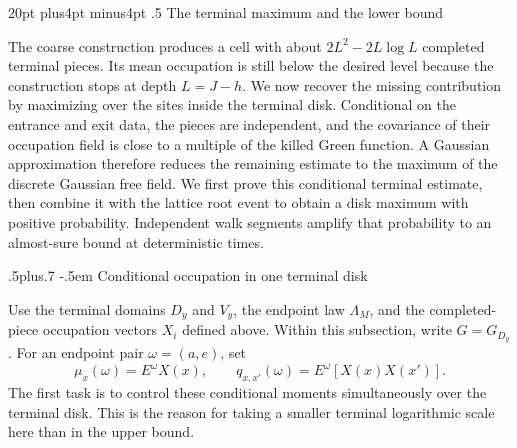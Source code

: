 \documentclass[12pt,reqno]{amsart}
\makeatletter
\def\section{\@startsection{section}{1}{0pt}%
  {20pt plus4pt minus4pt}
  {.5\linespacing}
  {\normalfont\bfseries}}
\def\subsection{\@startsection{subsection}{2}{0pt}%
  {.5\linespacing plus.7\linespacing}
  {-.5em}
  {\normalfont\scshape}}
\theoremstyle{plain}
\theoremstyle{definition}
\theoremstyle{remark}
\numberwithin{equation}{section}
\makeatother
\begin{document}
\section{The terminal maximum and the lower bound}
\label{sec:terminal-lower}

The coarse construction produces a cell with about
$2L^2-2L\log L$ completed terminal pieces.  Its mean occupation is
still below the desired level because the construction stops at depth
$L=J-h$.  We now recover the missing contribution by maximizing over
the sites inside the terminal disk.  Conditional on the entrance and
exit data, the pieces are independent, and the covariance of their
occupation field is close to a multiple of the killed Green function.
A Gaussian approximation therefore reduces the remaining estimate to
the maximum of the discrete Gaussian free field.
We first prove this conditional terminal estimate, then combine it with the
lattice root event to obtain a disk maximum with positive probability.
Independent walk segments amplify that probability to an almost-sure bound
at deterministic times.

\subsection{Conditional occupation in one terminal disk}

Use the terminal domains $D_y$ and $V_y$, the endpoint law $\Lambda_M$,
and the completed-piece occupation vectors $X_i$ defined above.  Within
this subsection, write $G=G_{D_y}$.  For an endpoint pair $\omega=(a,e)$,
set
\[
 \mu_x(\omega)=E^\omega X(x),\qquad
 q_{x,x'}(\omega)=E^\omega[X(x)X(x')].
\]
The first task is to control these conditional moments simultaneously
over the terminal disk.  This is the reason for taking a smaller
terminal logarithmic scale here than in the upper bound.
\end{document}
